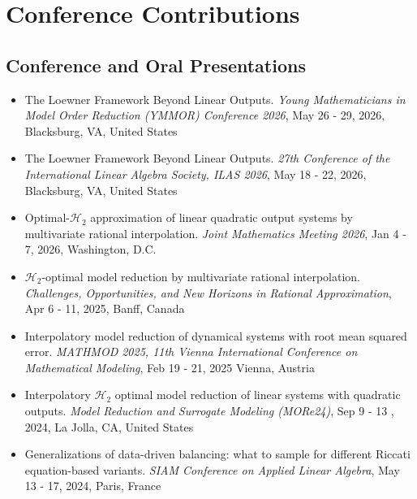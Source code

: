 \documentclass[10pt,a4paper,sans]{moderncv}        %
\begin{document}
\section{Conference Contributions}
\vspace{5pt}
\subsection{Conference and Oral Presentations}
\vspace{5pt}
\begin{itemize}
    \item The Loewner Framework Beyond Linear Outputs. \textit{Young Mathematicians in Model Order Reduction (YMMOR) Conference 2026}, May 26 - 29, 2026, Blacksburg, VA, United States
    \vspace{2pt}
    \item The Loewner Framework Beyond Linear Outputs. \textit{27th Conference of the International Linear Algebra Society, ILAS 2026}, May 18 - 22, 2026, Blacksburg, VA, United States
    \vspace{2pt}
    \item Optimal-$\mathcal{H}_2$ approximation of linear quadratic output systems by multivariate rational interpolation. \textit{Joint Mathematics Meeting 2026}, Jan 4 - 7, 2026, Washington, D.C.
    \vspace{2pt}
    \item $\mathcal{H}_2$-optimal model reduction by multivariate rational interpolation. \textit{Challenges, Opportunities, and New Horizons in Rational Approximation}, Apr 6 - 11, 2025, Banff, Canada
    \vspace{2pt}
    \item Interpolatory model reduction of dynamical systems with root mean squared error. \textit{MATHMOD 2025, 11th Vienna International Conference on Mathematical Modeling}, Feb 19 - 21, 2025 Vienna, Austria
    \vspace{2pt}
    \item Interpolatory $\mathcal{H}_2$ optimal model reduction of linear systems with quadratic outputs. \textit{Model Reduction and Surrogate Modeling (MORe24)}, Sep 9 - 13 , 2024, La Jolla, CA, United States
    \vspace{2pt}
    \item Generalizations of data-driven balancing: what to sample for different Riccati equation-based variants. \textit{SIAM Conference on Applied Linear Algebra}, May 13 - 17, 2024, Paris, France
    \vspace{2pt}

\end{itemize}
\end{document}

